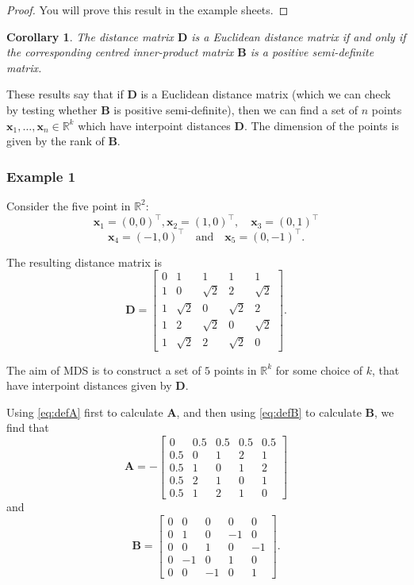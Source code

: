 \documentclass[]{book}
\newtheorem{corollary}{Corollary}[chapter]
\theoremstyle{definition}
\theoremstyle{definition}
\theoremstyle{definition}
\theoremstyle{remark}
\begin{document}
\begin{proof}
{}You will prove this result in the example sheets.
\end{proof}

\begin{corollary}
\protect\hypertarget{cor:unnamed-chunk-5}{}{\label{cor:unnamed-chunk-5} }The distance matrix \(\mathbf D\) is a Euclidean distance matrix if and only if the corresponding centred inner-product matrix \(\mathbf B\) is a positive semi-definite matrix.
\end{corollary}

These results say that if \(\mathbf D\) is a Euclidean distance matrix (which we can check by testing whether \(\mathbf B\) is positive semi-definite), then we can find a set of \(n\) points \(\mathbf x_1, \ldots, \mathbf x_n\in \mathbb{R}^k\) which have interpoint distances \(\mathbf D\). The dimension of the points is given by the rank of \(\mathbf B\).

\hypertarget{example-1}{%
\subsubsection*{Example 1}\label{example-1}}

Consider the five point in \(\mathbb{R}^2\):
\[
\mathbf x_1=(0,0)^\top,  \mathbf x_2 =(1,0)^\top, \quad \mathbf x_3 =(0,1)^\top
\]
\[
\mathbf x_4 =(-1,0)^\top \quad \text{and} \quad \mathbf x_5=(0,-1)^\top.
\]

The resulting distance matrix is
\[
\mathbf D=\left [ \begin{array}{ccccc}
0&1&1&1&1\\
1&0&\sqrt{2}&2&\sqrt{2}\\
1&\sqrt{2}&0&\sqrt{2}&2\\
1&2&\sqrt{2}&0&\sqrt{2}\\
1&\sqrt{2}&2&\sqrt{2}&0
\end{array} \right ].
\]

The aim of MDS is to construct a set of \(5\) points in \(\mathbb{R}^k\) for some choice of \(k\), that have interpoint distances given by \(\mathbf D\).

Using \eqref{eq:defA} first to calculate \(\mathbf A\), and then using \eqref{eq:defB} to calculate \(\mathbf B\), we find that
\[
\mathbf A=-\left [ \begin{array}{ccccc}
0&0.5&0.5&0.5&0.5\\
0.5&0&1&2&1\\
0.5&1&0&1&2\\
0.5&2&1&0&1\\
0.5&1&2&1&0
\end{array} \right ]
\]
and
\[
\mathbf B=\left [ \begin{array}{ccccc}
 0& 0&0&0&0\\
0&1&0&-1&0\\
0&0&1&0&-1\\
0&-1&0&1&0\\
0&0&-1&0&1
\end{array} \right ].
\]
\end{document}
